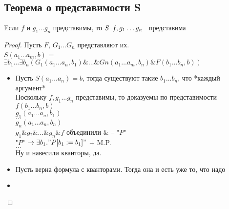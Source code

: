 \subsection{Теорема о представимости S}
\label{sec-11-5}
\begin{lemma}
Eсли $f$ и $g_1 \dots g_n$ представимы, то $S\template{f, g_1 \dots g_n}$ представима
\end{lemma}
\begin{proof}
Пусть $F$, $G_1 \dots G_n$ представляют их.\\
$S(a_1 \dots a_m, b)$ = $\exists b_1 \dots \exists b_n(G_1(a_1\dots a_n, b_1) \& \dots \& Gn(a_1 \dots a_m, b_n) \& F(b_1\dots b_n, b))$
\begin{itemize}
\item Пусть $S(a_1 \dots a_n) = b$, тогда существуют такие $b_1 \dots b_n$, что *каждый аргумент*\\
Поскольку $f, g_1 \dots g_n$ представимы, то доказуемы по представимости\\
$f(b_1 \dots b_n, b)$\\
$g_1(a_1 \dots a_n, b_1)$\\
$\dots$\\
$g_n(a_1 \dots a_n, b_n)$\\
$g_1 \& g₂ \& \dots  \& g_n \& f$ объединили \& -- "$P$"\\
"$P$" $\to \exists b_1."P[b_1:=b_1]"$ + M.P.\\
$\dots$\\
Ну и навесили кванторы, да.
\item Пусть верна формула с кванторами. Тогда она и есть уже то, что надо
\item {}
\end{itemize}
\end{proof}
